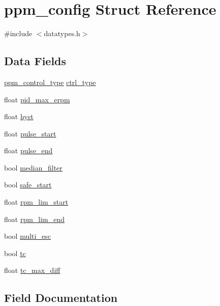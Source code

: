 \hypertarget{structppm__config}{}\section{ppm\+\_\+config Struct Reference}
\label{structppm__config}


{\ttfamily \#include $<$datatypes.\+h$>$}

\subsection*{Data Fields}
\begin{DoxyCompactItemize}
\item 
\hyperlink{datatypes_8h_a14705f90120ef780cd5aa6ecc24f7962}{ppm\+\_\+control\+\_\+type} \hyperlink{structppm__config_a373a0b006245c186188e4ac68f39db9d}{ctrl\+\_\+type}
\item 
float \hyperlink{structppm__config_ab44dc353a60628f787620a4faec3ac11}{pid\+\_\+max\+\_\+erpm}
\item 
float \hyperlink{structppm__config_a67e26f0a581dc7931b59e06f3a9d29e7}{hyst}
\item 
float \hyperlink{structppm__config_ad8f148ffc8779a35824ea7f52617d290}{pulse\+\_\+start}
\item 
float \hyperlink{structppm__config_a74a3425e91dd2001e1dcbee9b62db563}{pulse\+\_\+end}
\item 
bool \hyperlink{structppm__config_a281ed007208faa9df73da0d4ddb35b0a}{median\+\_\+filter}
\item 
bool \hyperlink{structppm__config_ae0f5e962b4f4f130fa815b8a1d17a24e}{safe\+\_\+start}
\item 
float \hyperlink{structppm__config_a009df1769dd668beb51124d481f57917}{rpm\+\_\+lim\+\_\+start}
\item 
float \hyperlink{structppm__config_a52298130b8eeda979a0ebe2f8683cf7f}{rpm\+\_\+lim\+\_\+end}
\item 
bool \hyperlink{structppm__config_a0adcb4125f8defe13178bad39f30b5f9}{multi\+\_\+esc}
\item 
bool \hyperlink{structppm__config_adb12b652190d775d7d98e95fcde39856}{tc}
\item 
float \hyperlink{structppm__config_a08878e275186fe365e2e23cc038fed07}{tc\+\_\+max\+\_\+diff}
\end{DoxyCompactItemize}


\subsection{Field Documentation}
\hypertarget{structppm__config_a373a0b006245c186188e4ac68f39db9d}{}
